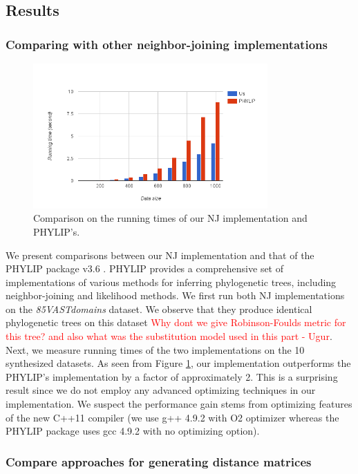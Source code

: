 \documentclass[11pt,letterpaper]{article}
\newcommand\ugur[1]{\textcolor{red}{#1 - Ugur}}
\theoremstyle{definition}
\begin{document}
\subsection{Results}

\subsubsection{Comparing with other neighbor-joining implementations}

\begin{figure}[t]
  \centering
  \includegraphics[width=0.8\textwidth]{runningtime.png}
  \caption{Comparison on the running times of our NJ implementation and PHYLIP's.}
  \label{fig:runningtime}
\end{figure}


We present comparisons between our NJ implementation and that of the PHYLIP package v3.6 \cite{felsenstein2005phylip}. PHYLIP provides a comprehensive set of implementations of various methods for inferring phylogenetic trees, including neighbor-joining and likelihood methods. We first run both NJ implementations on the \textit{85VASTdomains} dataset. We observe that they produce identical phylogenetic trees on this dataset \ugur{Why dont we give Robinson-Foulds metric for this tree? and also what was the substitution model used in this part}. Next, we measure running times of the two implementations on the 10 synthesized datasets. As seen from Figure \ref{fig:runningtime}, our implementation outperforms the PHYLIP's implementation by a factor of approximately 2. This is a surprising result since we do not employ any advanced optimizing techniques in our implementation. We suspect the performance gain stems from optimizing features of the new C++11 compiler (we use g++ 4.9.2 with O2 optimizer whereas the PHYLIP package uses gcc 4.9.2 with no optimizing option).  


\subsubsection{Compare approaches for generating distance matrices}
\end{document}
